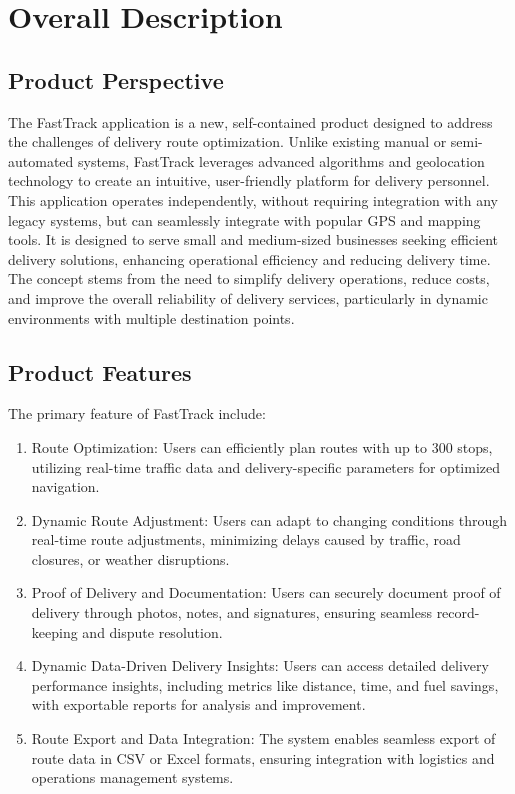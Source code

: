\section{Overall Description}
\subsection{Product Perspective}
The FastTrack application is a new, self-contained product designed to address the challenges of delivery route optimization. Unlike existing manual or semi-automated systems, FastTrack leverages advanced algorithms and geolocation technology to create an intuitive, user-friendly platform for delivery personnel.
This application operates independently, without requiring integration with any legacy systems, but can seamlessly integrate with popular GPS and mapping tools. It is designed to serve small and medium-sized businesses seeking efficient delivery solutions, enhancing operational efficiency and reducing delivery time.
The concept stems from the need to simplify delivery operations, reduce costs, and improve the overall reliability of delivery services, particularly in dynamic environments with multiple destination points.
\subsection{Product Features}
The primary feature of FastTrack include:
\begin{enumerate}
    \item Route Optimization: Users can efficiently plan routes with up to 300 stops, utilizing real-time traffic data and delivery-specific parameters for optimized navigation.
    \item Dynamic Route Adjustment: Users can adapt to changing conditions through real-time route adjustments, minimizing delays caused by traffic, road closures, or weather disruptions.
    \item Proof of Delivery and Documentation: Users can securely document proof of delivery through photos, notes, and signatures, ensuring seamless record-keeping and dispute resolution.
    \item Dynamic Data-Driven Delivery Insights: Users can access detailed delivery performance insights, including metrics like distance, time, and fuel savings, with exportable reports for analysis and improvement.
    \item Route Export and Data Integration: The system enables seamless export of route data in CSV or Excel formats, ensuring integration with logistics and operations management systems.
\end{enumerate}


